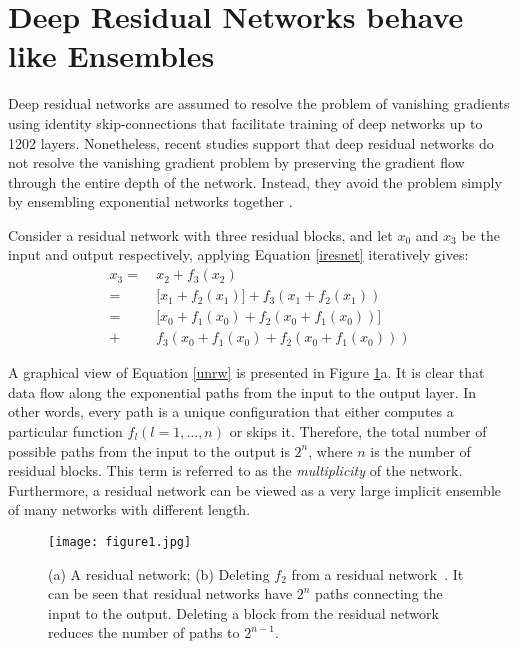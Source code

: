 \documentclass[journal]{IEEEtran}
\begin{document}
\section{Deep Residual Networks behave like Ensembles}\label{sec3}


Deep residual networks \cite{he2015deep} are assumed to resolve the problem of vanishing gradients using identity skip-connections that facilitate training of deep networks up to 1202 layers. Nonetheless, recent studies support that deep residual networks do not resolve the vanishing gradient problem by preserving the gradient flow through the entire depth of the network. Instead, they avoid the problem simply by ensembling exponential networks together \cite{veit2016residual}. 



Consider a residual network with three residual blocks, and let $x_0$ and $x_3$ be the input and output respectively, applying Equation \ref{iresnet} iteratively gives:
\begin{equation}\label{unrw}
\begin{split}
x_3 =&\ x_2 + f_3(x_2) \\
    =&\ \Big[ x_1 + f_2(x_1) \Big] + f_3(x_1+f_2(x_1)) \\
    =&\ \Big[ x_0 + f_1(x_0) + f_2(x_0+f_1(x_0)) \Big] \\
    +&\ f_3(x_0 + f_1(x_0) + f_2(x_0+f_1(x_0))) 
\end{split}
\end{equation}

A graphical view of Equation \ref{unrw} is presented in Figure \ref{fig:unreview}a. It is clear that data flow along the exponential paths from the input to the output layer. In other words, every path is a unique configuration that either computes a particular function $f_l(l=1,\dots,n)$ or skips it. Therefore, the total number of possible paths from the input to the output is $2^n$, where $n$ is the number of residual blocks. This term is referred to as the \textit{multiplicity} of the network.  Furthermore, a residual network can be viewed as a very large implicit ensemble of many networks with different length.

\begin{figure}[!htb]
\centering
\texttt{[image: figure1.jpg]}
\caption{(a) A residual network; (b) Deleting $f_2$ from a residual network~\protect\cite{veit2016residual}. It can be seen that residual networks have $2^n$ paths connecting the input to the output. Deleting a block from the residual network reduces the number of paths to $2^{n-1}$.}
\label{fig:unreview}
\end{figure}
\end{document}
